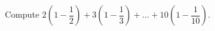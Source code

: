 Compute $2\left(1-\dfrac{1}{2}\right)+3\left(1-\dfrac{1}{3}\right)+\ldots+10\left(1-\dfrac{1}{10}\right)$.
